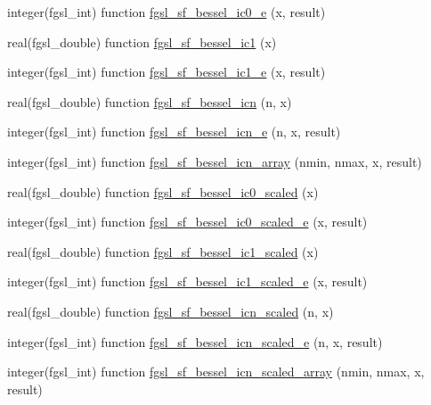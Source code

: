 \begin{DoxyCompactItemize}
\item 
integer(fgsl\-\_\-int) function \hyperlink{specfunc_8finc_a7b8276504f35982296fdb8f0a73ac700}{fgsl\-\_\-sf\-\_\-bessel\-\_\-ic0\-\_\-e} (x, result)
\item 
real(fgsl\-\_\-double) function \hyperlink{specfunc_8finc_a57ca7afe78547adb6e6a8bc0ae3fe151}{fgsl\-\_\-sf\-\_\-bessel\-\_\-ic1} (x)
\item 
integer(fgsl\-\_\-int) function \hyperlink{specfunc_8finc_a1a560a42327064c9157aeb31a5f087b9}{fgsl\-\_\-sf\-\_\-bessel\-\_\-ic1\-\_\-e} (x, result)
\item 
real(fgsl\-\_\-double) function \hyperlink{specfunc_8finc_a73b3d7193eb8237855b8092ed6fb1320}{fgsl\-\_\-sf\-\_\-bessel\-\_\-icn} (n, x)
\item 
integer(fgsl\-\_\-int) function \hyperlink{specfunc_8finc_a9a54b8667a7e68a6c786c9c013e638fd}{fgsl\-\_\-sf\-\_\-bessel\-\_\-icn\-\_\-e} (n, x, result)
\item 
integer(fgsl\-\_\-int) function \hyperlink{specfunc_8finc_acc794c9ba7b396f80bd9ec1f3683e647}{fgsl\-\_\-sf\-\_\-bessel\-\_\-icn\-\_\-array} (nmin, nmax, x, result)
\item 
real(fgsl\-\_\-double) function \hyperlink{specfunc_8finc_a1ba45c364c2186f7f7c4104ea4cbec0a}{fgsl\-\_\-sf\-\_\-bessel\-\_\-ic0\-\_\-scaled} (x)
\item 
integer(fgsl\-\_\-int) function \hyperlink{specfunc_8finc_a61d95545cf0d5ed13f88048c83a102a1}{fgsl\-\_\-sf\-\_\-bessel\-\_\-ic0\-\_\-scaled\-\_\-e} (x, result)
\item 
real(fgsl\-\_\-double) function \hyperlink{specfunc_8finc_a1376d1f85a72eb89941dfa0bb5f83bf2}{fgsl\-\_\-sf\-\_\-bessel\-\_\-ic1\-\_\-scaled} (x)
\item 
integer(fgsl\-\_\-int) function \hyperlink{specfunc_8finc_a84b633483b90407d430234d42efd37ab}{fgsl\-\_\-sf\-\_\-bessel\-\_\-ic1\-\_\-scaled\-\_\-e} (x, result)
\item 
real(fgsl\-\_\-double) function \hyperlink{specfunc_8finc_a1796b471859cc00a3bc313795e954ab8}{fgsl\-\_\-sf\-\_\-bessel\-\_\-icn\-\_\-scaled} (n, x)
\item 
integer(fgsl\-\_\-int) function \hyperlink{specfunc_8finc_a3bee5c7f1b8bd64220882a37fe6222c1}{fgsl\-\_\-sf\-\_\-bessel\-\_\-icn\-\_\-scaled\-\_\-e} (n, x, result)
\item 
integer(fgsl\-\_\-int) function \hyperlink{specfunc_8finc_a2f95a0c0c77e1521ead5d98240f81cc0}{fgsl\-\_\-sf\-\_\-bessel\-\_\-icn\-\_\-scaled\-\_\-array} (nmin, nmax, x, result)
\item 

\end{DoxyCompactItemize}
